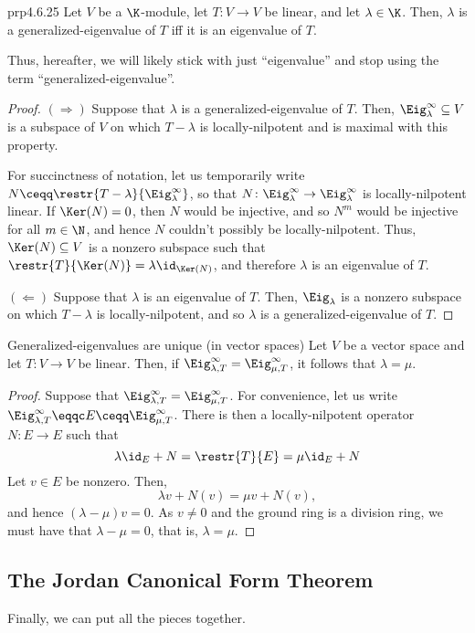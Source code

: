 \begin{prp}{}{prp4.6.25}
	Let $V$ be a $\K$-module, let $T\colon V\rightarrow V$ be linear, and let $\lambda \in \K$.  Then, $\lambda$ is a generalized-eigenvalue of $T$ iff it is an eigenvalue of $T$.
	\begin{rmk}
		Thus, hereafter, we will likely stick with just ``eigenvalue'' and stop using the term ``generalized-eigenvalue''.
	\end{rmk}
	\begin{proof}
		$(\Rightarrow )$ Suppose that $\lambda$ is a generalized-eigenvalue of $T$.  Then, $\Eig _{\lambda}^{\infty}\subseteq V$ is a subspace of $V$ on which $T-\lambda$ is locally-nilpotent and is maximal with this property.
		
		For succinctness of notation, let us temporarily write $N\ceqq \restr{T-\lambda}{\Eig _{\lambda}^{\infty}}$, so that $N\colon \Eig _{\lambda}^{\infty}\rightarrow \Eig _{\lambda}^{\infty}$ is locally-nilpotent linear.  If $\Ker (N)=0$, then $N$ would be injective, and so $N^m$ would be injective for all $m\in \N$, and hence $N$ couldn't possibly be locally-nilpotent.  Thus, $\Ker (N)\subseteq V$ is a nonzero subspace such that $\restr{T}{\Ker (N)}=\lambda \id _{\Ker (N)}$, and therefore $\lambda$ is an eigenvalue of $T$.
		
		\blni
		$(\Leftarrow )$ Suppose that $\lambda$ is an eigenvalue of $T$.  Then, $\Eig _{\lambda}$ is a nonzero subspace on which $T-\lambda$ is locally-nilpotent, and so $\lambda$ is a generalized-eigenvalue of $T$.
	\end{proof}
\end{prp}
\begin{prp}{Generalized-eigenvalues are unique (in vector spaces)}{}
	Let $V$ be a vector space and let $T\colon V\rightarrow V$ be linear.  Then, if $\Eig _{\lambda ,T}^{\infty}=\Eig _{\mu ,T}^{\infty}$, it follows that $\lambda =\mu$.
	\begin{proof}
		Suppose that $\Eig _{\lambda ,T}^{\infty}=\Eig _{\mu ,T}^{\infty}$.  For convenience, let us write $\Eig _{\lambda ,T}^{\infty}\eqqc E\ceqq \Eig _{\mu ,T}^{\infty}$.  There is then a locally-nilpotent operator $N\colon E\rightarrow E$ such that
		\begin{equation}
			\lambda \id _E+N=\restr{T}{E}=\mu \id _E+N
		\end{equation}
		Let $v\in E$ be nonzero.  Then,
		\begin{equation}
			\lambda v+N(v)=\mu v+N(v),
		\end{equation}
		and hence $(\lambda -\mu )v=0$.  As $v\neq 0$ and the ground ring is a division ring, we must have that $\lambda -\mu =0$, that is, $\lambda =\mu$.
	\end{proof}
\end{prp}

\subsection{The Jordan Canonical Form Theorem}

Finally, we can put all the pieces together.